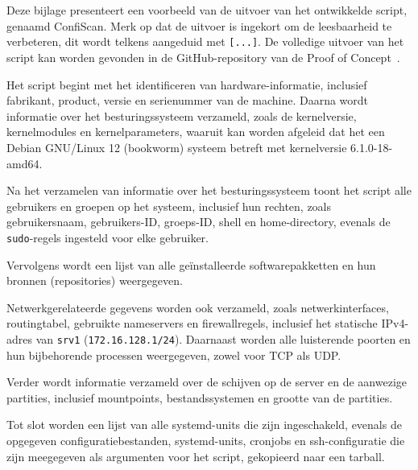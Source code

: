 
\chapter{}%
\label{ch:bijlage_confiscan}

Deze bijlage presenteert een voorbeeld van de uitvoer van het ontwikkelde script, genaamd ConfiScan.
Merk op dat de uitvoer is ingekort om de leesbaarheid te verbeteren, dit wordt telkens aangeduid met \texttt{[...]}.
De volledige uitvoer van het script kan worden gevonden in de GitHub-repository van de Proof of Concept~\autocite{github-poc}.

Het script begint met het identificeren van hardware-informatie, inclusief fabrikant, product, versie en serienummer van de machine.
Daarna wordt informatie over het besturingssysteem verzameld, zoals de kernelversie, kernelmodules en kernelparameters, waaruit kan worden afgeleid dat het een Debian GNU/Linux 12 (bookworm) systeem betreft met kernelversie 6.1.0-18-amd64.

Na het verzamelen van informatie over het besturingssysteem toont het script alle gebruikers en groepen op het systeem, inclusief hun rechten, zoals gebruikersnaam, gebruikers-ID, groeps-ID, shell en home-directory, evenals de \texttt{sudo}-regels ingesteld voor elke gebruiker.

Vervolgens wordt een lijst van alle ge\"installeerde softwarepakketten en hun bronnen (repositories) weergegeven.

Netwerkgerelateerde gegevens worden ook verzameld, zoals netwerkinterfaces, routingtabel, gebruikte nameservers en firewallregels, inclusief het statische IPv4-adres van \texttt{srv1} (\texttt{172.16.128.1/24}).
Daarnaast worden alle luisterende poorten en hun bijbehorende processen weergegeven, zowel voor TCP als UDP.

Verder wordt informatie verzameld over de schijven op de server en de aanwezige partities, inclusief mountpoints, bestandssystemen en grootte van de partities.

Tot slot worden een lijst van alle systemd-units die zijn ingeschakeld, evenals de opgegeven configuratiebestanden, systemd-units, cronjobs en ssh-configuratie die zijn meegegeven als argumenten voor het script, gekopieerd naar een tarball.

